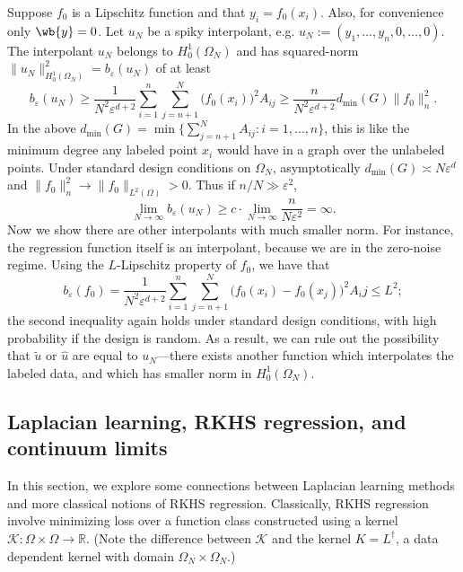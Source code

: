 \documentclass{article}
\newcommand{\Reals}{\mathbb{R}}
\newcommand{\1}{\mathbf{1}}
\newcommand{\Leb}{L}
\newcommand{\mc}[1]{\mathcal{#1}}
\newcommand{\wt}[1]{\widetilde{#1}}
\newcommand{\wh}[1]{\widehat{#1}}
\theoremstyle{definition}
\theoremstyle{remark}
\begin{document}
Suppose $f_0$ is a Lipschitz function and that $y_i = f_0(x_i)$. Also, for convenience only $\wb{y} = 0$. Let $u_N$ be a spiky interpolant, e.g. $u_N := (y_1,\ldots,y_n, 0,\ldots,0)$. The interpolant $u_N$ belongs to $H_0^1(\Omega_N)$ and has squared-norm $\|u_N\|_{H_0^1(\Omega_N)}^2 = b_{\varepsilon}(u_N)$ of at least
\begin{equation*}
b_{\varepsilon}(u_N) \geq \frac{1}{N^2 \varepsilon^{d + 2}} \sum_{i = 1}^{n} \sum_{j = n + 1}^{N} \bigl(f_0(x_i)\bigr)^2 A_{ij} \geq \frac{n}{N^2 \varepsilon^{d + 2}} d_{\min}(G) \|f_0\|_n^2.
\end{equation*} 
In the above $d_{\min}(G) = \min\bigl\{\sum_{j = n + 1}^{N} A_{ij}: i = 1,\ldots,n\bigr\}$, this is like the minimum degree any labeled point $x_i$ would have in a graph over the unlabeled points. Under standard design conditions on $\Omega_N$, asymptotically $d_{\min}(G) \asymp N\varepsilon^d$ and $\|f_0\|_n^2 \to \|f_0\|_{\Leb^2(\Omega)} > 0$. Thus if $n/N \gg \varepsilon^2$,
\begin{equation*}
\lim_{N \to \infty} b_{\varepsilon}(u_N) \geq c \cdot \lim_{N \to \infty} \frac{n}{N \varepsilon^2} = \infty.
\end{equation*}
Now we show there are other interpolants with much smaller norm. For instance, the regression function itself is an interpolant, because we are in the zero-noise regime. Using the $L$-Lipschitz property of $f_0$, we have that
\begin{equation*}
b_{\varepsilon}(f_0) = \frac{1}{N^2 \varepsilon^{d + 2}} \sum_{i = 1}^{n} \sum_{j = n + 1}^{N} \bigl(f_0(x_i) - f_0(x_j)\bigr)^2 A_ij \leq L^2;
\end{equation*}
the second inequality again holds under standard design conditions, with high probability if the design is random. As a result, we can rule out the possibility that $\wt{u}$ or $\wh{u}$ are equal to $u_N$---there exists another function which interpolates the labeled data, and which has smaller norm in $H_0^1(\Omega_N)$.  

\subsection{Laplacian learning, RKHS regression, and continuum limits}
\label{subsec:laplacian_learning_continuum_limits}
In this section, we explore some connections between Laplacian learning methods and more classical notions of RKHS regression. Classically, RKHS regression involve minimizing loss over a function class constructed using a kernel $\mc{K}: \Omega \times \Omega \to \Reals$. (Note the difference between $\mc{K}$ and the kernel $K = L^{\dagger}$, a data dependent kernel with domain $\Omega_N \times \Omega_N$.)
\end{document}
